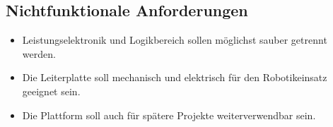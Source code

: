 \subsection{Nichtfunktionale Anforderungen}
\begin{itemize}
	\item Leistungselektronik und Logikbereich sollen möglichst sauber getrennt werden.
	\item Die Leiterplatte soll mechanisch und elektrisch für den Robotikeinsatz geeignet sein.
	\item Die Plattform soll auch für spätere Projekte weiterverwendbar sein.
\end{itemize}

